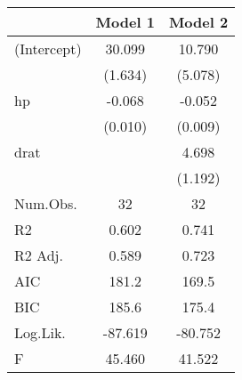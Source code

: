 \begin{table}
\centering
\begin{tabular}[t]{lSS}
\toprule
  & {Model 1} & {Model 2}\\
\midrule
(Intercept) & 30.099 & 10.790\\
 & (1.634) & (5.078)\\
hp & -0.068 & -0.052\\
 & (0.010) & (0.009)\\
drat & {} & 4.698\\
 & {} & (1.192)\\
\midrule
Num.Obs. & 32 & 32\\
R2 & 0.602 & 0.741\\
R2 Adj. & 0.589 & 0.723\\
AIC & 181.2 & 169.5\\
BIC & 185.6 & 175.4\\
Log.Lik. & -87.619 & -80.752\\
F & 45.460 & 41.522\\
\bottomrule
\end{tabular}
\end{table}
